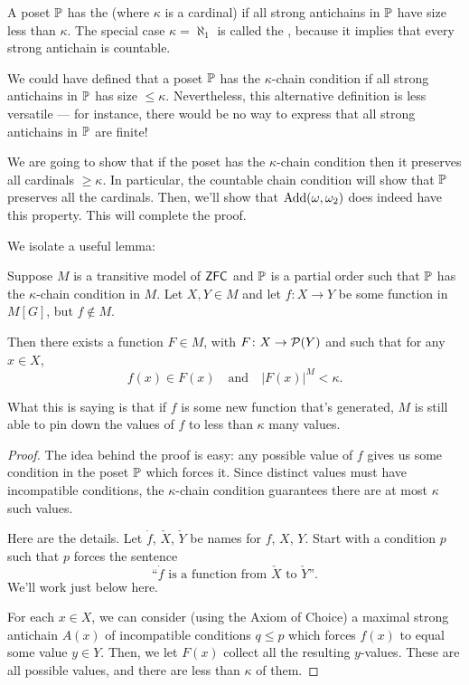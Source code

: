 \begin{definition}
	A poset $\mathbb P$ has the 
	(where $\kappa$ is a cardinal) if all strong antichains
	in $\mathbb P$ have size less than $\kappa$.
	The special case $\kappa = \aleph_1$ is called the ,
	because it implies that every strong antichain is countable.
\end{definition}

\begin{remark}
	We could have defined that a poset $\mathbb P$ has the $\kappa$-chain condition if all strong
	antichains in $\mathbb P$ has size $\leq \kappa$. Nevertheless, this alternative definition is less
	versatile --- for instance, there would be no way to express that all strong antichains
	in $\mathbb P$ are finite!
\end{remark}

We are going to show that if the poset has the $\kappa$-chain condition
then it preserves all cardinals $\geq \kappa$.
In particular, the countable chain condition will show that $\mathbb P$ preserves all the cardinals.
Then, we'll show that $\operatorname{Add}(\omega, \omega_2)$ does indeed have this property.
This will complete the proof.

We isolate a useful lemma:
\begin{lemma}
	Suppose $M$ is a transitive model of $\mathsf{ZFC}$ and $\mathbb P$ is a partial order
	such that $\mathbb P$ has the $\kappa$-chain condition in $M$.
	Let $X,Y \in M$ and let $f \colon X \to Y$
	be some function in $M[G]$, but $f \notin M$.

	Then there exists a function $F \in M$, with $F \colon X \to \mathcal P(Y)$ and such that
	for any $x \in X$,
	\[ f(x) \in F(x) \quad\text{and}\quad \left\lvert F(x) \right\rvert^M < \kappa. \]
\end{lemma}
What this is saying is that if $f$ is some new function that's generated,
$M$ is still able to pin down the values of $f$ to less than $\kappa$ many values.

\begin{proof}
	The idea behind the proof is easy: any possible value of $f$ gives us some condition in
	the poset $\mathbb P$ which forces it.
	Since distinct values must have incompatible conditions,
	the $\kappa$-chain condition guarantees
	there are at most $\kappa$ such values.

	Here are the details.
	Let $\dot f$, $\check X$, $\check Y$ be names for $f$, $X$, $Y$.
	Start with a condition $p$ such that $p$ forces the sentence
	\[ \text{``$\dot f$ is a function from $\check X$ to $\check Y$''}. \]
	We'll work just below here.

	For each $x \in X$, we can consider (using the Axiom of Choice) a maximal strong antichain $A(x)$
	of incompatible conditions $q \le p$ which forces $f(x)$ to equal some value $y \in Y$.
	Then, we let $F(x)$ collect all the resulting $y$-values.
	These are all possible values, and there are less than $\kappa$ of them.
\end{proof}


